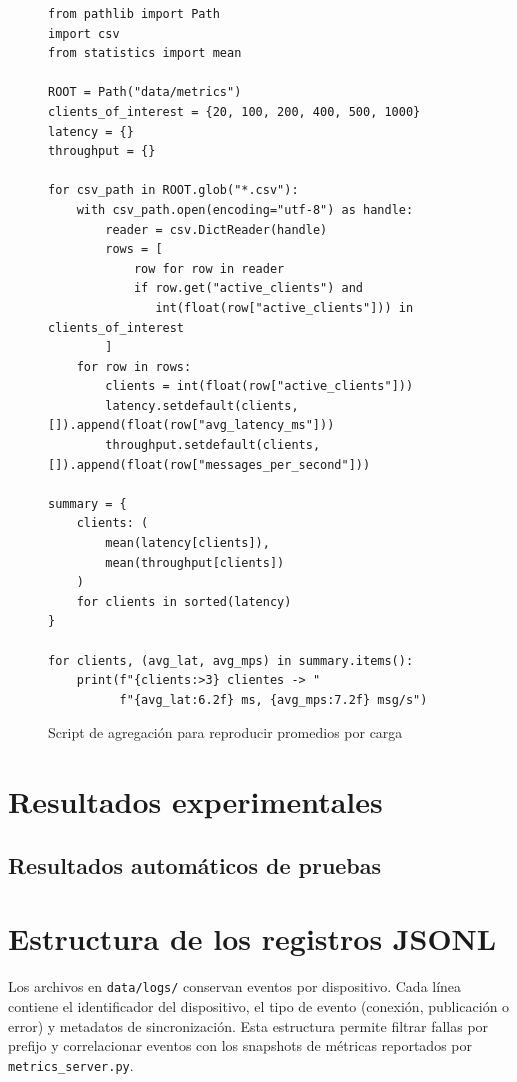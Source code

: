 ﻿\documentclass[conference]{IEEEtran}
\begin{document}
\begin{figure}[!t]
\centering
\begin{verbatim}
from pathlib import Path
import csv
from statistics import mean

ROOT = Path("data/metrics")
clients_of_interest = {20, 100, 200, 400, 500, 1000}
latency = {}
throughput = {}

for csv_path in ROOT.glob("*.csv"):
    with csv_path.open(encoding="utf-8") as handle:
        reader = csv.DictReader(handle)
        rows = [
            row for row in reader
            if row.get("active_clients") and
               int(float(row["active_clients"])) in clients_of_interest
        ]
    for row in rows:
        clients = int(float(row["active_clients"]))
        latency.setdefault(clients, []).append(float(row["avg_latency_ms"]))
        throughput.setdefault(clients, []).append(float(row["messages_per_second"]))

summary = {
    clients: (
        mean(latency[clients]),
        mean(throughput[clients])
    )
    for clients in sorted(latency)
}

for clients, (avg_lat, avg_mps) in summary.items():
    print(f"{clients:>3} clientes -> "
          f"{avg_lat:6.2f} ms, {avg_mps:7.2f} msg/s")
\end{verbatim}
\caption{Script de agregaci\'on para reproducir promedios por carga}
\label{lst:agregacion}
\end{figure}

\section{Resultados experimentales}
\label{sec:resultados-experimentales}
\subsection{Resultados automáticos de pruebas}


\section{Estructura de los registros JSONL}
Los archivos en \texttt{data/logs/} conservan eventos por dispositivo. Cada l\'inea contiene el identificador del dispositivo, el tipo de evento (conexi\'on, publicaci\'on o error) y metadatos de sincronizaci\'on. Esta estructura permite filtrar fallas por prefijo y correlacionar eventos con los snapshots de m\'etricas reportados por \texttt{metrics\_server.py}.
\end{document}
